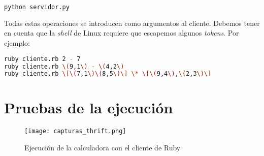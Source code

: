 \begin{lstlisting}[language=sh]
python servidor.py
\end{lstlisting}

Todas estas operaciones se introducen como argumentos al cliente.
Debemos tener en cuenta que la \textit{shell} de Linux requiere que escapemos algunos \textit{tokens}.
Por ejemplo:

\begin{lstlisting}[language=sh]
ruby cliente.rb 2 - 7
ruby cliente.rb \(9,1\) - \(4,2\)
ruby cliente.rb \[\(7,1\)\(8,5\)\] \* \[\(9,4\),\(2,3\)\]
\end{lstlisting}

\pagebreak

\section{Pruebas de la ejecución}

\begin{figure}[ht!]
\begin{center}
	\texttt{[image: capturas\_thrift.png]}
\end{center}
\caption{Ejecución de la calculadora con el cliente de Ruby}
\end{figure}

